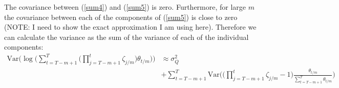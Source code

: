 The covariance between (\ref{sum4}) and (\ref{sum5}) is zero. Furthermore, for large $m$ the covariance between each of the components of (\ref{sum5}) is close to zero (NOTE: I need to show the exact approximation I am using here). Therefore we can calculate the variance as the sum of the variance of each of the individual components:
\begin{align*}
\mathrm{Var} \Bigg( \log\Bigg( \sum_{t=T-m+1}^{T} \Big(\prod_{j=T-m+1}^{t} \zeta_{j/m}\Big) \theta_{t/m} \Bigg) \Bigg) &\approx \sigma^2_Q \\
& +  \sum_{t=T-m+1}^{T} \mathrm{Var} \Bigg(\Big(\prod_{j=T-m+1}^{t} \zeta_{j/m} -1\Big) \frac{\theta_{t/m} }{\sum_{t=T-m+1}^{T} \theta_{t/m}} \Bigg)
\end{align*}

